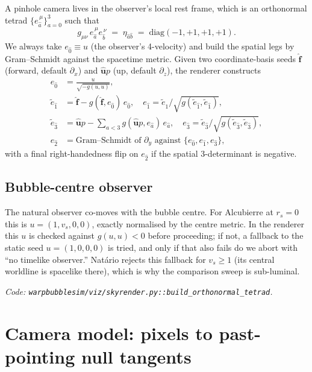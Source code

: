 \documentclass[11pt]{article}
\begin{document}
A pinhole camera lives in the observer's local rest frame, which is an
orthonormal tetrad $\{e_{\hat a}^{\,\mu}\}_{a=0}^3$ such that
\begin{equation}
g_{\mu\nu}\,e_{\hat a}^{\,\mu} e_{\hat b}^{\,\nu} \;=\; \eta_{\hat a\hat b}
\;=\; \mathrm{diag}(-1,+1,+1,+1).
\end{equation}
We always take $e_{\hat 0}\equiv u$ (the observer's 4-velocity) and build
the spatial legs by Gram--Schmidt against the spacetime metric.  Given
two coordinate-basis seeds $\hat{\bm f}$ (forward, default $\partial_x$)
and $\hat{\bm u}p$ (up, default $\partial_z$), the renderer constructs
\begin{align}
e_{\hat 0} &= \frac{u}{\sqrt{-g(u,u)}},\\
\tilde e_{\hat 1} &= \hat{\bm f} - g(\hat{\bm f}, e_{\hat 0})\,e_{\hat 0},\quad e_{\hat 1} = \tilde e_{\hat 1}/\!\sqrt{g(\tilde e_{\hat 1},\tilde e_{\hat 1})},\\
\tilde e_{\hat 3} &= \hat{\bm u}p - \sum_{a<3}\!g(\hat{\bm u}p, e_{\hat a})\,e_{\hat a},\quad e_{\hat 3} = \tilde e_{\hat 3}/\!\sqrt{g(\tilde e_{\hat 3},\tilde e_{\hat 3})},\\
e_{\hat 2} &= \text{Gram--Schmidt of }\partial_y\text{ against }\{e_{\hat 0},e_{\hat 1},e_{\hat 3}\},
\end{align}
with a final right-handedness flip on $e_{\hat 2}$ if the spatial 3-determinant
is negative.

\subsection*{Bubble-centre observer}
The natural observer co-moves with the bubble centre.  For Alcubierre at
$r_s\!=\!0$ this is $u=(1,v_s,0,0)$, exactly normalised by the centre
metric.  In the renderer this $u$ is checked against $g(u,u)<0$ before
proceeding; if not, a fallback to the static seed $u=(1,0,0,0)$ is tried,
and only if that also fails do we abort with ``no timelike observer.''
Natário rejects this fallback for $v_s\!\geq\!1$ (its central worldline is
spacelike there), which is why the comparison sweep is sub-luminal.

\smallskip
\noindent\emph{Code: \texttt{warpbubblesim/viz/skyrender.py::build\_orthonormal\_tetrad}.}

\section{Camera model: pixels to past-pointing null tangents}
\end{document}
